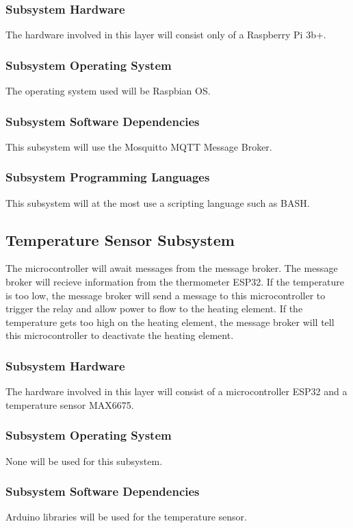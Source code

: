 \subsubsection{Subsystem Hardware}
The hardware involved in this layer will consist only of a Raspberry Pi 3b+.

\subsubsection{Subsystem Operating System}
The operating system used will be Raspbian OS.

\subsubsection{Subsystem Software Dependencies}
This subsystem will use the Mosquitto MQTT Message Broker. 

\subsubsection{Subsystem Programming Languages}
This subsystem will at the most use a scripting language such as BASH. 

\subsection{Temperature Sensor Subsystem}
The microcontroller will await messages from the message broker. The message
broker will recieve information from the thermometer ESP32. If the temperature
is too low, the message broker will send a message to this microcontroller to
trigger the relay and allow power to flow to the heating element. If the
temperature gets too high on the heating element, the message broker will tell
this microcontroller to deactivate the heating element.

\subsubsection{Subsystem Hardware}
The hardware involved in this layer will consist of a microcontroller ESP32 and a temperature
sensor MAX6675. 

\subsubsection{Subsystem Operating System}
None will be used for this subsystem.

\subsubsection{Subsystem Software Dependencies}
Arduino libraries will be used for the temperature sensor. 

